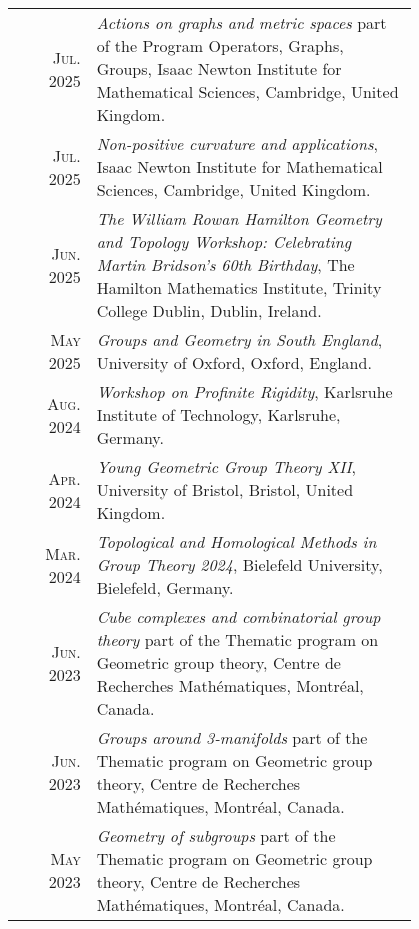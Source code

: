 \documentclass[a4paper,11pt]{article} %
\begin{document}
\begin{longtable}{rp{0.8\linewidth}}

	\textsc{Jul. 2025} &\emph{Actions on graphs and metric spaces} part of the Program Operators, Graphs, Groups, Isaac Newton Institute for Mathematical Sciences, Cambridge, United Kingdom. \\ %

	\textsc{Jul. 2025} &\emph{Non-positive curvature and applications}, Isaac Newton Institute for Mathematical Sciences, Cambridge, United Kingdom. \\ %
	
	\textsc{Jun. 2025} & \emph{The William Rowan Hamilton Geometry and Topology Workshop: Celebrating Martin Bridson's 60th Birthday}, The Hamilton Mathematics Institute, Trinity College Dublin, Dublin, Ireland. \\ %
	
	\textsc{May 2025} & \emph{Groups and Geometry in South England}, University of Oxford, Oxford, England. \\ %

    \textsc{Aug. 2024} & \emph{Workshop on Profinite Rigidity}, Karlsruhe Institute of Technology, Karlsruhe,
    Germany. \\ %

    \textsc{Apr. 2024} & \emph{Young Geometric Group Theory XII}, University of Bristol, Bristol, United Kingdom. \\ %
    
    \textsc{Mar. 2024} & \emph{Topological and Homological Methods in Group Theory 2024}, Bielefeld
    University, Bielefeld, Germany. \\ %

    \textsc{Jun. 2023} & \emph{Cube complexes and combinatorial group theory} part of the Thematic program on Geometric group theory, Centre de Recherches Mathématiques, Montréal, Canada. \\ %
    
    \textsc{Jun. 2023} & \emph{Groups around 3-manifolds} part of the Thematic program on Geometric group theory,
    Centre de Recherches Mathématiques, Montréal, Canada. \\ %

    \textsc{May 2023} & \emph{Geometry of subgroups} part of the Thematic program on Geometric group theory, Centre
    de Recherches Mathématiques, Montréal, Canada. \\ %


\end{longtable}
\end{document}
